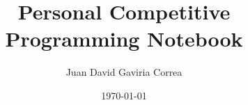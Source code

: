\documentclass[8pt]{article}
\title{\Large{\textbf{
	Personal Competitive Programming Notebook
}}}
\author{Juan David Gaviria Correa}
\date{\today}
\begin{document}
\begin{landscape}
	\setlength{\columnseprule}{0.4pt}
	\setlength{\columnsep}{40pt}
	\begin{multicols}{2}

		\pagestyle{fancy}

		\maketitle
		\vfill\null
		\columnbreak

		\tableofcontents
		\vfill\null
		\columnbreak

		

	\end{multicols}
\end{landscape}
\end{document}
